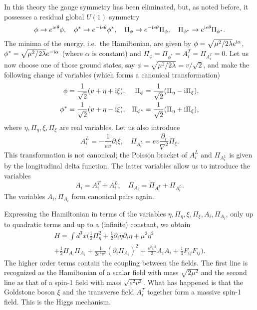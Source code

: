 \documentclass[12pt]{article}
\def\ii{\textrm i}
\begin{document}
In this theory the gauge symmetry has been eliminated, but, as noted before, it possesses a residual global $U(1)$ symmetry
\begin{equation}
 \phi \to e^{\ii e \theta}  \phi , \quad  \phi^* \to e^{-\ii e \theta} \phi^*,\quad \Pi_{ \phi} \to e^{-\ii e \theta}\Pi_{\phi} ,\quad \Pi_{ \phi^*} \to e^{\ii e \theta} \Pi_{ \phi^*}. 
\label{h.3}
\end{equation}
The minima of the energy, i.e.\ the Hamiltonian, are given by $\phi = \sqrt{\mu^2/2\lambda} e^{\ii \alpha}$, $\phi^* = \sqrt{\mu^2/2\lambda} e^{-\ii \alpha}$  (where $\alpha$ is constant) and $\Pi_{ \phi}=\Pi_{ \phi^*}=A^T_i=\Pi_{A^T_i}=0$. Let us now choose one of those ground states, say $ \phi = \sqrt{\mu^2/2\lambda}=v/\sqrt{2}$, and make the following change of variables (which forms a canonical transformation)
\begin{align}
 \phi &= \frac{1}{\sqrt{2}} (v + \eta + \ii \xi) , & \Pi_{ \phi} &= \frac{1}{\sqrt{2}} (\Pi_{\eta}  - \ii \Pi_{\xi} ), \nonumber\\
 \phi^* &= \frac{1}{\sqrt{2}} (v + \eta - \ii \xi) , & \Pi_{ \phi^*} &= \frac{1}{\sqrt{2}} (\Pi_{\eta}  + \ii \Pi_{\xi} ),
\label{h.4}
\end{align}
where $\eta,\Pi_{\eta},\xi,\Pi_{\xi}$ are real variables. Let us also introduce
\begin{equation}
A^L_i = - \frac{1}{ev}\partial_i \xi , \quad \Pi_{A^L_i} = ev \frac{\partial_i}{\nabla^2}\Pi_{\xi}.
\label{h.5}
\end{equation}
This transformation is not canonical; the Poisson bracket of $A^L_i$ and $\Pi_{A^L_i}$ is given by the longitudinal delta function. The latter variables allow us to introduce the variables 
\begin{equation}
A_i =A^T_i +A^L_i , \quad \Pi_{A_i} = \Pi_{A^T_i} + \Pi_{A^L_i}.
\label{h.6}
\end{equation}
The variables $A_i, \Pi_{A_i}$ form canonical pairs again.

Expressing the Hamiltonian in terms of the variables $\eta,\Pi_{\eta},\xi,\Pi_{\xi},A_i, \Pi_{A_i}$, only up to quadratic terms and up to a (infinite) constant, we obtain
\begin{multline}
H = \int d^3 x \bigg(\frac{1}{2} \Pi^2_{\eta}  + \frac{1}{2} \partial_i \eta \partial_i \eta + \mu^2 \eta^2 \\
+ \frac{1}{2} \Pi_{A_i}\Pi_{A_i} + \frac{1}{2e^2v^2} \left(\partial_i \Pi_{A_i}\right)^2 + \frac{e^2v^2}{2} A_iA_i + \frac{1}{4}F_{ij}F_{ij}  \bigg). 
\label{h.7}
\end{multline}
The higher order terms contain the coupling between the fields. The first line is recognized as the Hamiltonian of a scalar field with mass $\sqrt{2\mu^2}$ and the second line as that of a spin-1 field with mass $\sqrt{e^2v^2}$. What has happened is that the Goldstone boson $\xi$ and the transverse field $A^T_i$ together form a massive spin-1 field. This is the Higgs mechanism. 
\end{document}
